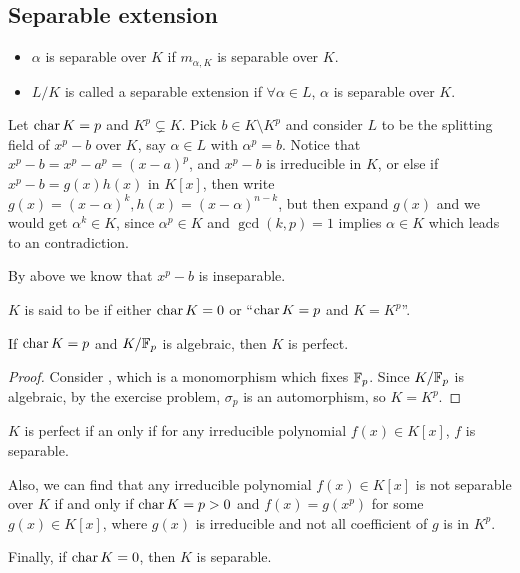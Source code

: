 \subsection{Separable extension}

\begin{definition} \hfill
  \begin{itemize}
    \item $\alpha$ is separable over $K$ if $m_{\alpha, K}$ is separable over $K$.
    \item $L/K$ is called a separable extension if $\forall \alpha \in L$, $\alpha$ is separable over $K$.
  \end{itemize}
\end{definition}

\begin{example}
  Let $\operatorname{char} K = p$ and $K^p \subsetneq K$. Pick $b \in K \setminus K^p$ and consider $L$ to be
  the splitting field of $x^p - b$ over $K$, say $\alpha \in L$ with $\alpha^p = b$.
  Notice that $x^p - b = x^p - a^p = (x - a)^p$, and $x^p - b$ is irreducible in $K$, or else
  if $x^p - b = g(x) h(x)$ in $K[x]$, then write $g(x) = (x - \alpha)^k, h(x) = (x - \alpha)^{n-k}$,
  but then expand $g(x)$ and we would get $\alpha^k \in K$, since $\alpha^p \in K$ and
  $\gcd(k, p) = 1$ implies $\alpha \in K$ which leads to an contradiction.

  By above we know that $x^p - b$ is inseparable.
\end{example}

\begin{definition}
  $K$ is said to be \emph{} if either $\operatorname{char} K = 0$ or ``$\operatorname{char} K = p$ and $K = K^p$''.
\end{definition}

\begin{example}
  If $\operatorname{char} K = p$ and ${K}/{\mathbb{F}_p}$ is algebraic, then $K$ is perfect.

  \begin{proof}
    Consider , which is a monomorphism which fixes $\mathbb{F}_p$.
    Since ${K}/{\mathbb{F}_p}$ is algebraic, by the exercise problem, $\sigma_p$ is an automorphism, so $K = K^p$.
  \end{proof}
\end{example}

\begin{fact}
  $K$ is perfect if an only if for any irreducible polynomial $f(x) \in K[x]$, $f$ is separable.

  Also, we can find that any irreducible polynomial $f(x) \in K[x]$ is not separable over $K$
  if and only if $\operatorname{char} K = p > 0$ and $f(x) = g(x^p)$ for some $g(x) \in K[x]$, where
  $g(x)$ is irreducible and not all coefficient of $g$ is in $K^p$.

  Finally, if $\operatorname{char} K = 0$, then $K$ is separable.
\end{fact}

